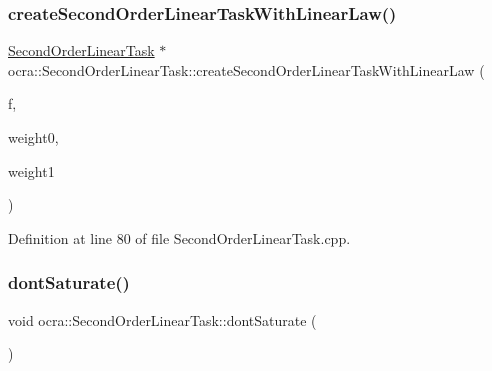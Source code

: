 \hypertarget{classocra_1_1SecondOrderLinearTask_a3320983d1930ac8b049116b186d17dd1}{}\label{classocra_1_1SecondOrderLinearTask_a3320983d1930ac8b049116b186d17dd1} 
\subsubsection{\texorpdfstring{create\+Second\+Order\+Linear\+Task\+With\+Linear\+Law()}{createSecondOrderLinearTaskWithLinearLaw()}\hspace{0.1cm}{\footnotesize\ttfamily [2/2]}}
{\footnotesize\ttfamily \hyperlink{classocra_1_1SecondOrderLinearTask}{Second\+Order\+Linear\+Task} $\ast$ ocra\+::\+Second\+Order\+Linear\+Task\+::create\+Second\+Order\+Linear\+Task\+With\+Linear\+Law (\begin{DoxyParamCaption}\item[{\hyperlink{classocra_1_1Function}{Function} $\ast$}]{f,  }\item[{const Vector\+Xd \&}]{weight0,  }\item[{const Vector\+Xd \&}]{weight1 }\end{DoxyParamCaption})\hspace{0.3cm}{\ttfamily [static]}}



Definition at line 80 of file Second\+Order\+Linear\+Task.\+cpp.

\hypertarget{classocra_1_1SecondOrderLinearTask_a8e155a518199e0ae1b8eca4915d46420}{}\label{classocra_1_1SecondOrderLinearTask_a8e155a518199e0ae1b8eca4915d46420} 
\subsubsection{\texorpdfstring{dont\+Saturate()}{dontSaturate()}}
{\footnotesize\ttfamily void ocra\+::\+Second\+Order\+Linear\+Task\+::dont\+Saturate (\begin{DoxyParamCaption}{ }\end{DoxyParamCaption})\hspace{0.3cm}{\ttfamily [inline]}}



